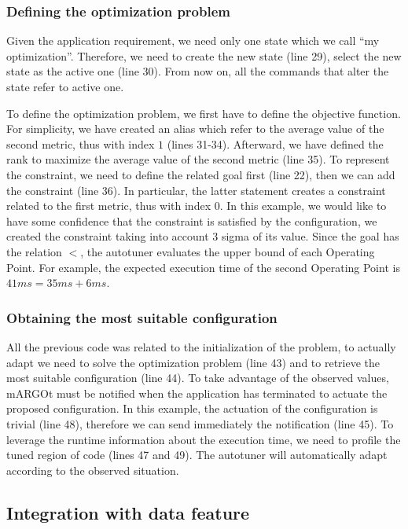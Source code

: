 \subsubsection*{Defining the optimization problem}

Given the application requirement, we need only one state which we call ``my optimization''.
Therefore, we need to create the new state (line 29), select the new state as the active one (line 30).
From now on, all the commands that alter the state refer to active one.

To define the optimization problem, we first have to define the objective function.
For simplicity, we have created an alias which refer to the average value of the second metric, thus with index $1$ (lines 31-34).
Afterward, we have defined the rank to maximize the average value of the second metric (line 35).
To represent the constraint, we need to define the related goal first (line 22), then we can add the constraint (line 36).
In particular, the latter statement creates a constraint related to the first metric, thus with index $0$.
In this example, we would like to have some confidence that the constraint is satisfied by the configuration, we created the constraint taking into account $3$ sigma of its value.
Since the goal has the relation $<$, the autotuner evaluates the upper bound of each Operating Point.
For example, the expected execution time of the second Operating Point is $41ms = 35ms + 6ms$.

\subsubsection*{Obtaining the most suitable configuration}
All the previous code was related to the initialization of the problem, to actually adapt we need to solve the optimization problem (line 43) and to retrieve the most suitable configuration (line 44).
To take advantage of the observed values, mARGOt must be notified when the application has terminated to actuate the proposed configuration.
In this example, the actuation of the configuration is trivial (line 48), therefore we can send immediately the notification (line 45).
To leverage the runtime information about the execution time, we need to profile the tuned region of code (lines 47 and 49).
The autotuner will automatically adapt according to the observed situation.



\subsection{Integration with data feature}


